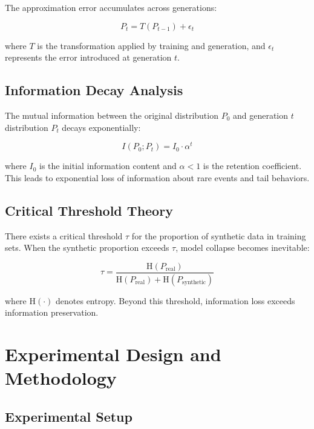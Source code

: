 \documentclass{article}
\begin{document}
The approximation error accumulates across generations:

\begin{equation}
P_t = T(P_{t-1}) + \epsilon_t
\end{equation}

where $T$ is the transformation applied by training and generation, and $\epsilon_t$ represents the error introduced at generation $t$.

\subsection{Information Decay Analysis}

The mutual information between the original distribution $P_0$ and generation $t$ distribution $P_t$ decays exponentially:

\begin{equation}
I(P_0; P_t) = I_0 \cdot \alpha^t
\end{equation}

where $I_0$ is the initial information content and $\alpha < 1$ is the retention coefficient. This leads to exponential loss of information about rare events and tail behaviors.

\subsection{Critical Threshold Theory}

There exists a critical threshold $\tau$ for the proportion of synthetic data in training sets. When the synthetic proportion exceeds $\tau$, model collapse becomes inevitable:

\begin{equation}
\tau = \frac{\text{H}(P_{\text{real}})}{\text{H}(P_{\text{real}}) + \text{H}(P_{\text{synthetic}})}
\end{equation}

where $\text{H}(\cdot)$ denotes entropy. Beyond this threshold, information loss exceeds information preservation.

\section{Experimental Design and Methodology}

\subsection{Experimental Setup}
\end{document}

